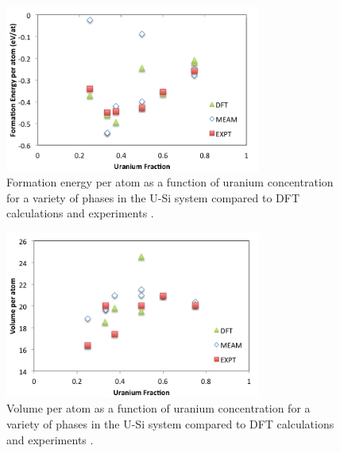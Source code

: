 \documentclass[review]{elsarticle}
\begin{document}
\begin{figure}[hbt]
	\centering
	\includegraphics[width=0.75\textwidth]{ben3b.png}
    \caption{Formation energy per atom as a function of uranium concentration for a variety of phases in the U-Si system compared to DFT calculations \cite{noordhoek2016} and experiments \cite{berche2009}.}\label{fig:ben3}
\end{figure}

 \begin{figure}[hbt]
	\centering
	\includegraphics[width=0.75\textwidth]{ben4b.png}
    \caption{Volume per atom as a function of uranium concentration for a variety of phases in the U-Si system compared to DFT calculations \cite{noordhoek2016} and experiments \cite{berche2009}.}\label{fig:ben4}
\end{figure}

\FloatBarrier
\end{document}
